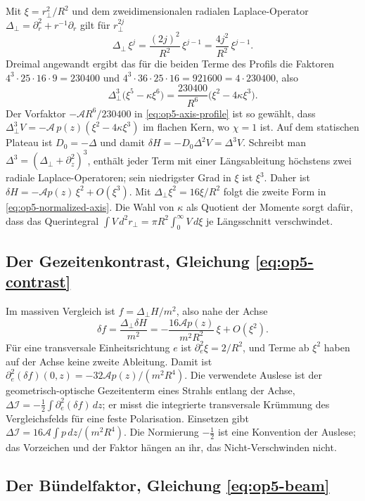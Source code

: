 Mit \(\xi=r_\perp^2/R^2\) und dem zweidimensionalen radialen Laplace-Operator \(\Delta_\perp=\partial_r^2+r^{-1}\partial_r\) gilt für \(r_\perp^{2j}\)
\[
 \Delta_\perp\,\xi^j=\frac{(2j)^2}{R^2}\,\xi^{j-1}=\frac{4j^2}{R^2}\,\xi^{j-1}.
\]
Dreimal angewandt ergibt das für die beiden Terme des Profils die Faktoren \(4^3\cdot25\cdot16\cdot9=230400\) und
\(4^3\cdot36\cdot25\cdot16=921600=4\cdot230400\), also
\[
 \Delta_\perp^3\bigl(\xi^5-\kappa\xi^6\bigr)=\frac{230400}{R^6}\bigl(\xi^2-4\kappa\xi^3\bigr).
\]
Der Vorfaktor \(-\mathcal A R^6/230400\) in \eqref{eq:op5-axis-profile} ist so gewählt, dass \(\Delta_\perp^3V=-\mathcal A\,p(z)(\xi^2-4\kappa\xi^3)\)
im flachen Kern, wo \(\chi=1\) ist. Auf dem statischen Plateau ist \(D_0=-\Delta\) und damit \(\delta H=-D_0\Delta^2V=\Delta^3V\). Schreibt man
\(\Delta^3=(\Delta_\perp+\partial_z^2)^3\), enthält jeder Term mit einer Längsableitung höchstens zwei radiale Laplace-Operatoren; sein
niedrigster Grad in \(\xi\) ist \(\xi^3\). Daher ist \(\delta H=-\mathcal A p(z)\,\xi^2+O(\xi^3)\). Mit \(\Delta_\perp\xi^2=16\xi/R^2\) folgt die zweite
Form in \eqref{eq:op5-normalized-axis}. Die Wahl von \(\kappa\) als Quotient der Momente sorgt dafür, dass das Querintegral
\(\int V\,d^2r_\perp=\pi R^2\int_0^\infty V\,d\xi\) je Längsschnitt verschwindet.

\subsection{Der Gezeitenkontrast, Gleichung \eqref{eq:op5-contrast}}
\label{sec:anhang-b-kontrast}

Im massiven Vergleich ist \(f=\Delta_\perp H/m^2\), also nahe der Achse
\[
 \delta f=\frac{\Delta_\perp\delta H}{m^2}=-\frac{16\mathcal A p(z)}{m^2R^2}\,\xi+O(\xi^2).
\]
Für eine transversale Einheitsrichtung \(e\) ist \(\partial_e^2\xi=2/R^2\), und Terme ab \(\xi^2\) haben auf der Achse keine zweite Ableitung.
Damit ist \(\partial_e^2(\delta f)(0,z)=-32\mathcal A p(z)/(m^2R^4)\). Die verwendete Auslese ist der geometrisch-optische Gezeitenterm eines
Strahls entlang der Achse, \(\Delta\mathcal I=-\tfrac12\int\partial_e^2(\delta f)\,dz\); er misst die integrierte transversale Krümmung des
Vergleichsfelds für eine feste Polarisation. Einsetzen gibt \(\Delta\mathcal I=16\mathcal A\int p\,dz/(m^2R^4)\). Die Normierung
\(-\tfrac12\) ist eine Konvention der Auslese; das Vorzeichen und der Faktor hängen an ihr, das Nicht-Verschwinden nicht.

\subsection{Der Bündelfaktor, Gleichung \eqref{eq:op5-beam}}
\label{sec:anhang-b-buendel}

